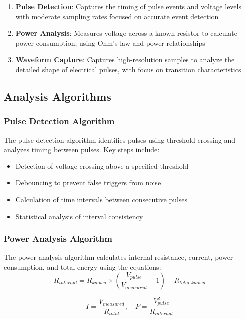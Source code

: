\documentclass[conference]{IEEEtran}
\begin{document}
\begin{enumerate}
    \item \textbf{Pulse Detection}: Captures the timing of pulse events and voltage levels with moderate sampling rates focused on accurate event detection
    \item \textbf{Power Analysis}: Measures voltage across a known resistor to calculate power consumption, using Ohm's law and power relationships
    \item \textbf{Waveform Capture}: Captures high-resolution samples to analyze the detailed shape of electrical pulses, with focus on transition characteristics
\end{enumerate}

\subsection{Analysis Algorithms}
\subsubsection{Pulse Detection Algorithm}
The pulse detection algorithm identifies pulses using threshold crossing and analyzes timing between pulses. Key steps include:
\begin{itemize}
    \item Detection of voltage crossing above a specified threshold
    \item Debouncing to prevent false triggers from noise
    \item Calculation of time intervals between consecutive pulses
    \item Statistical analysis of interval consistency
\end{itemize}

\subsubsection{Power Analysis Algorithm}
The power analysis algorithm calculates internal resistance, current, power consumption, and total energy using the equations:
\begin{equation}
R_{internal} = R_{known} \times \left(\frac{V_{pulse}}{V_{measured}} - 1\right) - R_{total\_known}
\end{equation}

\begin{equation}
I = \frac{V_{measured}}{R_{total}}, \quad P = \frac{V_{pulse}^2}{R_{internal}}
\end{equation}
\end{document}
